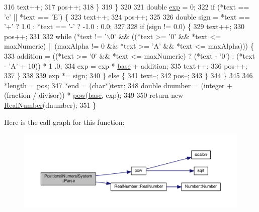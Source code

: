\begin{DoxyCode}
316             text++;
317             pos++;
318         \}
319     \}
320 
321     \textcolor{keywordtype}{double} \hyperlink{math_8h_ae09128febbbe6372cde4fa0c65608a42}{exp} = 0;
322     \textcolor{keywordflow}{if} (*text == \textcolor{charliteral}{'e'} || *text == \textcolor{charliteral}{'E'}) \{
323         text++;
324         pos++;
325 
326         \textcolor{keywordtype}{double} sign = *text == \textcolor{charliteral}{'+'} ? 1.0 : *text == \textcolor{charliteral}{'-'} ? -1.0 : 0.0;
327 
328         \textcolor{keywordflow}{if} (sign != 0.0) \{
329             text++;
330             pos++;
331 
332             \textcolor{keywordflow}{while} (*text != \textcolor{charliteral}{'\(\backslash\)0'} && ((*text >= \textcolor{charliteral}{'0'} && *text <= maxNumeric) || (maxAlpha != 0 && *text >= \textcolor{charliteral}{
      'A'} && *text <= maxAlpha))) \{
333                 addition = ((*text >= \textcolor{charliteral}{'0'} && *text <= maxNumeric) ? (*text - \textcolor{charliteral}{'0'}) : (*text - \textcolor{charliteral}{'A'} + 10)) * 1
      .0;
334                 exp = exp * \hyperlink{classPositionalNumeralSystem_a50cd19222978e16cc9c8b481c72c4662}{base} + addition;
335                 text++;
336                 pos++;
337             \}
338 
339             exp *= sign;
340         \} \textcolor{keywordflow}{else} \{
341             text--;
342             pos--;
343         \}
344     \}
345 
346     *length = pos;
347     *end = (\textcolor{keywordtype}{char}*)text;
348     \textcolor{keywordtype}{double} dnumber = (integer + (fraction / divisor)) * \hyperlink{math_8h_aa56c9494c95edf68386375e97d64159b}{pow}(\hyperlink{classPositionalNumeralSystem_a50cd19222978e16cc9c8b481c72c4662}{base}, exp);
349 
350     \textcolor{keywordflow}{return} \textcolor{keyword}{new} \hyperlink{structRealNumber}{RealNumber}(dnumber);
351 \}
\end{DoxyCode}


Here is the call graph for this function\+:
\nopagebreak
\begin{figure}[H]
\begin{center}
\leavevmode
\includegraphics[width=350pt]{d6/ddc/classPositionalNumeralSystem_a6fd2861b5cd8da952191218121df7f56_cgraph}
\end{center}
\end{figure}


